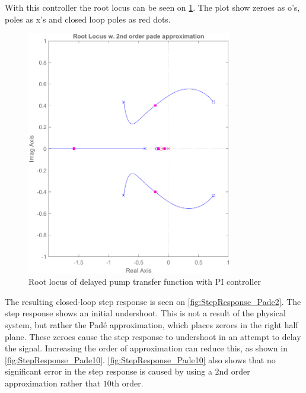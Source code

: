 With this controller the root locus can be seen on \cref{fig:RootLocus_PadeTwo}. The plot show zeroes as o's, poles as x's and closed loop poles as red dots.
\begin{figure}[h!]
	\centering
	\includegraphics[width=0.8\textwidth]{Pictures/RootLocus_Pade2.png}
	
	\caption{Root locus of delayed pump transfer function with PI controller}
	\label{fig:RootLocus_PadeTwo}
\end{figure}

The resulting closed-loop step response is seen on \cref{fig:StepResponse_Pade2}. The step response shows an initial undershoot. This is not a result of the physical system, but rather the Padé approximation, which places zeroes in the right half plane. These zeroes cause the step response to undershoot in an attempt to delay the signal. Increasing the order of approximation can reduce this, as shown in \cref{fig:StepResponse_Pade10}. \cref{fig:StepResponse_Pade10} also shows that no significant error in the step response is caused by using a $2$nd order approximation rather that $10$th order.

